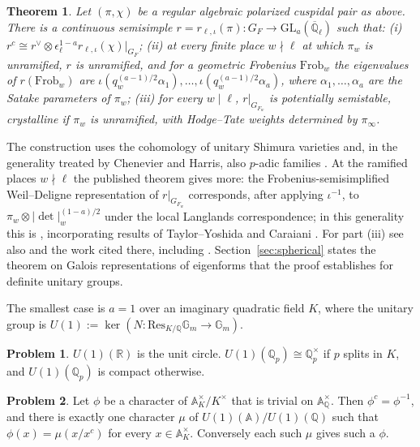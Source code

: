\documentclass[reqno]{amsart}
\theoremstyle{definition}
\newtheorem{problem}{Problem}[section]
\theoremstyle{plain}
\newtheorem{theorem}{Theorem}[section]
\newcommand{\Q}{\mathbb{Q}}
\newcommand{\R}{\mathbb{R}}
\newcommand{\A}{\mathbb{A}}
\newcommand{\Qlb}{\overline{\Q}_\ell}
\newcommand{\GL}{\mathrm{GL}}
\newcommand{\Frob}{\mathrm{Frob}}
\begin{document}
\begin{theorem}\label{thm:galois}
Let \((\pi, \chi)\) be a regular algebraic polarized cuspidal pair as above.  There is a continuous semisimple \(r = r_{\ell,\iota}(\pi) \colon G_F \to \GL_a(\Qlb)\) such that:
\textup{(i)} \(r^c \cong r^\vee \otimes \epsilon_\ell^{1-a} r_{\ell,\iota}(\chi)|_{G_F}\);
\textup{(ii)} at every finite place \(w \nmid \ell\) at which \(\pi_w\) is unramified, \(r\) is unramified, and for a geometric Frobenius \(\Frob_w\) the eigenvalues of \(r(\Frob_w)\) are \(\iota(q_w^{(a-1)/2}\alpha_1), \dots, \iota(q_w^{(a-1)/2}\alpha_a)\), where \(\alpha_1, \dots, \alpha_a\) are the Satake parameters of \(\pi_w\);
\textup{(iii)} for every \(w \mid \ell\), \(r|_{G_{F_w}}\) is potentially semistable, crystalline if \(\pi_w\) is unramified, with Hodge--Tate weights determined by \(\pi_\infty\).
\end{theorem}

The construction uses the cohomology of unitary Shimura varieties and, in the generality treated by Chenevier and Harris, also \(p\)-adic families \cite{Cl,HT,Shi,CH}.  At the ramified places \(w \nmid \ell\) the published theorem gives more: the Frobenius-semisimplified Weil--Deligne representation of \(r|_{G_{F_w}}\) corresponds, after applying \(\iota^{-1}\), to \(\pi_w \otimes \lvert\det\rvert_w^{(1-a)/2}\) under the local Langlands correspondence; in this generality this is \cite[Thm.~2.1.1]{BLGGT}, incorporating results of Taylor--Yoshida and Caraiani \cite{TY,Car1}.  For part (iii) see also \cite[Thm.~2.1.1]{BLGGT} and the work cited there, including \cite{Car2}.  Section~\ref{sec:spherical} states the theorem on Galois representations of eigenforms that the proof establishes for definite unitary groups.

The smallest case is \(a = 1\) over an imaginary quadratic field \(K\), where the unitary group is \(U(1) := \ker(N \colon \mathrm{Res}_{K/\Q}\mathbb{G}_m \to \mathbb{G}_m)\).

\begin{problem}\label{pr:U1-local}
\(U(1)(\R)\) is the unit circle.  \(U(1)(\Q_p) \cong \Q_p^\times\) if \(p\) splits in \(K\), and \(U(1)(\Q_p)\) is compact otherwise.
\end{problem}

\begin{problem}\label{pr:U1-descent}
Let \(\phi\) be a character of \(\A_K^\times/K^\times\) that is trivial on \(\A_\Q^\times\).  Then \(\phi^c = \phi^{-1}\), and there is exactly one character \(\mu\) of \(U(1)(\A)/U(1)(\Q)\) such that \(\phi(x) = \mu(x/x^c)\) for every \(x \in \A_K^\times\).  Conversely each such \(\mu\) gives such a \(\phi\).
\end{problem}
\end{document}

